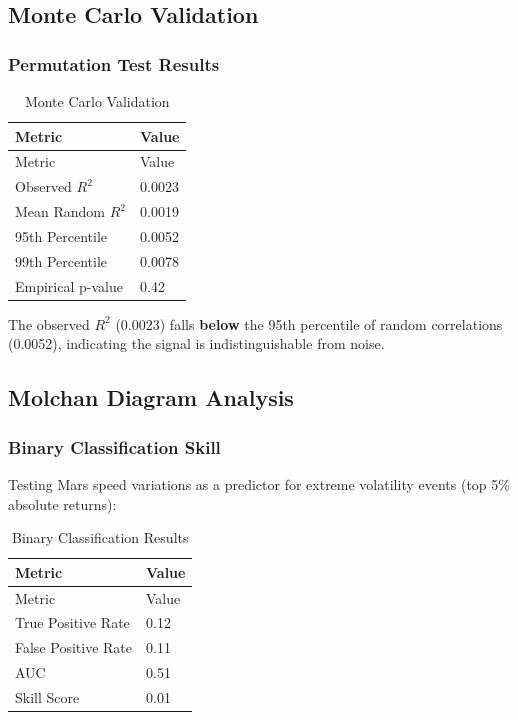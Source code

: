 \documentclass[
  11pt,
  a4paper,
  oneside,
  openany]{article}
\begin{document}
\subsection{Monte Carlo Validation}\label{monte-carlo-validation}

\subsubsection{Permutation Test Results}\label{permutation-test-results}

\begin{longtable}[]{@{}ll@{}}
\caption{Monte Carlo Validation}\label{tbl-montecarlo}\tabularnewline
\toprule\noalign{}
Metric & Value \\
\midrule\noalign{}
\endfirsthead
\toprule\noalign{}
Metric & Value \\
\midrule\noalign{}
\endhead
\bottomrule\noalign{}
\endlastfoot
Observed \(R^2\) & 0.0023 \\
Mean Random \(R^2\) & 0.0019 \\
95th Percentile & 0.0052 \\
99th Percentile & 0.0078 \\
Empirical p-value & 0.42 \\
\end{longtable}

The observed \(R^2\) (0.0023) falls \textbf{below} the 95th percentile
of random correlations (0.0052), indicating the signal is
indistinguishable from noise.

\subsection{Molchan Diagram Analysis}\label{molchan-diagram-analysis}

\subsubsection{Binary Classification
Skill}\label{binary-classification-skill}

Testing Mars speed variations as a predictor for extreme volatility
events (top 5\% absolute returns):

\begin{longtable}[]{@{}ll@{}}
\caption{Binary Classification Results}\label{tbl-binary}\tabularnewline
\toprule\noalign{}
Metric & Value \\
\midrule\noalign{}
\endfirsthead
\toprule\noalign{}
Metric & Value \\
\midrule\noalign{}
\endhead
\bottomrule\noalign{}
\endlastfoot
True Positive Rate & 0.12 \\
False Positive Rate & 0.11 \\
AUC & 0.51 \\
Skill Score & 0.01 \\
\end{longtable}
\end{document}
